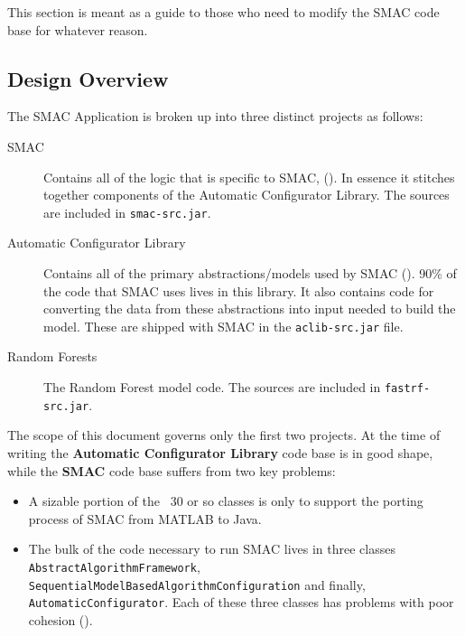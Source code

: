 \documentclass[manual.tex]{subfiles}
\begin{document}
This section is meant as a guide to those who need to modify the SMAC code base for whatever reason.

\subsection{Design Overview}

The SMAC Application is broken up into three distinct projects as follows:

\begin{description}

\item[SMAC] Contains all of the logic that is specific to SMAC, (). In essence it stitches together components of the Automatic Configurator Library. The sources are included in \texttt{smac-src.jar}.

\item[Automatic Configurator Library] Contains all of the primary abstractions/models used by SMAC (). 90\% of the code that SMAC uses lives in this library. It also contains code for converting the data from these abstractions into input needed to build the model. These are shipped with SMAC in the \texttt{aclib-src.jar} file.

\item[Random Forests] The Random Forest model code. The sources are included in \texttt{fastrf-src.jar}. 

\end{description}

The scope of this document governs only the first two projects. At the time of writing the \textbf{Automatic Configurator Library} code base is in good shape, while the \textbf{SMAC} code base suffers from two key problems:



\begin{itemize}
\item 	A sizable portion of the ~30 or so classes is only to support the porting process of SMAC from MATLAB to Java.

\item	The bulk of the code necessary to run SMAC lives in three classes \\ \texttt{AbstractAlgorithmFramework}, \\
 \texttt{SequentialModelBasedAlgorithmConfiguration} and finally, \\ \texttt{AutomaticConfigurator}. Each of these three classes has problems with poor cohesion ().

\end{itemize}
\end{document}
